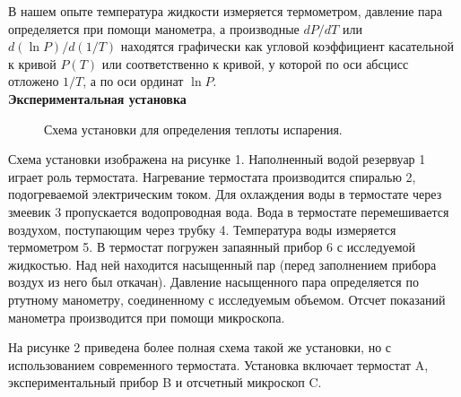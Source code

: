 \documentclass[a4paper, 12pt]{article}%
\begin{document}
	В нашем опыте температура жидкости измеряется термометром, давление пара определяется при помощи манометра, а производные $ dP/dT $ или $ d(\ln P)/d(1/T) $ находятся графически как угловой коэффициент касательной к кривой $ P(T) $ или соответственно к кривой, у которой по оси абсцисс отложено $ 1/T $, а по оси ординат $ \ln P $.\\
	
    \textbf{Экспериментальная установка}\\
	
	\begin{figure}[H]
		\caption{Схема установки для определения теплоты испарения.}
	\end{figure}

	Схема установки изображена на рисунке 1. Наполненный водой резервуар 1 играет роль термостата. Нагревание термостата производится спиралью 2, подогреваемой электрическим током. Для охлаждения воды в термостате через змеевик 3 пропускается водопроводная вода. Вода в термостате перемешивается воздухом, поступающим через трубку 4. Температура воды измеряется термометром 5. В термостат погружен запаянный прибор 6 с исследуемой жидкостью. Над ней находится насыщенный пар (перед заполнением прибора воздух из него был откачан). Давление насыщенного пара определяется по ртутному манометру, соединенному с исследуемым объемом. Отсчет показаний манометра производится при помощи микроскопа.
	
	На рисунке 2 приведена более полная схема такой же установки, но с использованием современного термостата. Установка включает термостат A, экспериментальный прибор B и отсчетный микроскоп C.
	
\end{document}
